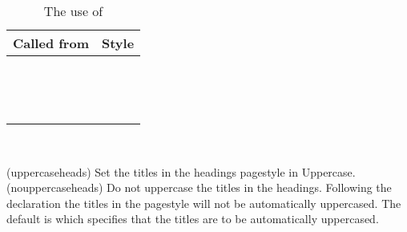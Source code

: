 \begin{table}
\centering
\caption{The use of \protect{}} \label{tab:callthispagestyle}
\begin{tabular}{l !{\qquad} l} \toprule
Called from & Style \\ \midrule
\cmd{\book}    &  \\
\cmd{\chapter} &  \\
\cmd{\cleardoublepage} &  \\
\cmd{\cleartorecto} &  \\
\cmd{\cleartoverso} &  \\
\cmd{\epigraphhead} &  \\
\cmd{\listoffigures} &  \\
\cmd{\listoftables} &  \\
\cmd{\maketitle} &  \\
\cmd{\part}      &  \\
\cmd{\tableofcontents} &  \\
 &  \\
 &  \\
 &  \\
\bottomrule
\end{tabular}
\end{table}

\begin{syntax}
\cmd{\uppercaseheads} \cmd{\nouppercaseheads}  \\
\end{syntax}
\glossary(uppercaseheads)%
  {}%
  {Set the titles in the headings pagestyle in Uppercase.}
\glossary(nouppercaseheads)%
  {}%
  {Do not uppercase the titles in the headings.}
    Following the declaration \cmd{\nouppercaseheads} the titles in the
 pagestyle will not be automatically uppercased. The default
is \cmd{\uppercaseheads} which specifies that the titles are to be
automatically uppercased.

